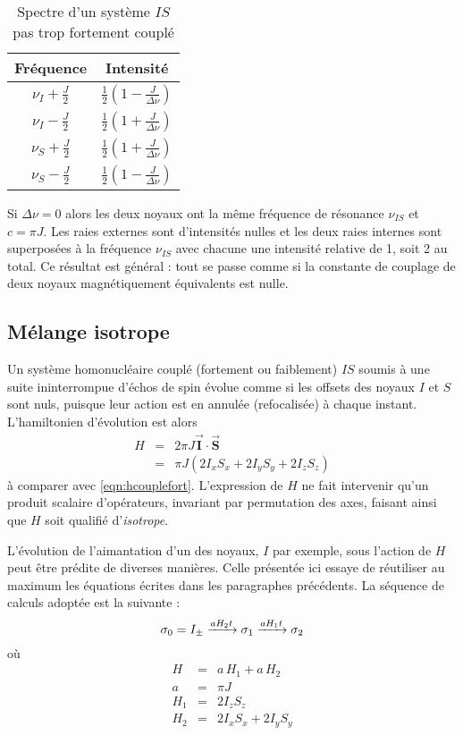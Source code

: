 \begin{table}[hbt]
\caption{Spectre d'un système $IS$ pas trop fortement couplé}
\label{tab:pastropfort}
\begin{center}
\begin{tabular}{cc}
\hline
Fréquence & Intensité \\ \hline
$\nu_I + \frac{J}{2}$ & 
$\frac{1}{2}\left(1 - \frac{J}{\Delta\nu} \right)$ \\
$\nu_I - \frac{J}{2}$ & 
$\frac{1}{2}\left(1 + \frac{J}{\Delta\nu} \right)$ \\
$\nu_S + \frac{J}{2}$ & 
$\frac{1}{2}\left(1 + \frac{J}{\Delta\nu} \right)$ \\
$\nu_S - \frac{J}{2}$ & 
$\frac{1}{2}\left(1 - \frac{J}{\Delta\nu} \right)$ \\
\hline
\end{tabular}
\end{center}
\end{table}

Si $\Delta\nu = 0$ alors les deux noyaux ont la même fréquence de résonance $\nu_{IS}$
et $c = \pi J$. Les raies externes sont d'intensités nulles et les deux raies internes
sont superposées à la fréquence $\nu_{IS}$ avec chacune une intensité relative de 1,
soit 2 au total.
Ce résultat est général : tout se passe comme si la constante de
couplage de deux noyaux magnétiquement équivalents est nulle.

\subsection{Mélange isotrope}
Un système homonucléaire couplé (fortement ou faiblement) 
$IS$ soumis à une suite ininterrompue d'échos de
spin évolue comme si les offsets des noyaux $I$ et $S$ sont nuls,
puisque leur action est en annulée (refocalisée) à chaque instant.
L'hamiltonien d'évolution est alors
\begin{eqnarray}
H & = & 2\pi J \boldsymbol{\vec{I}} \cdot \boldsymbol{\vec{S}} \\
\label{eqn:hisotrope}
& = & \pi J (2I_xS_x + 2I_yS_y + 2I_zS_z)
\end{eqnarray}
à comparer avec \ref{eqn:hcouplefort}.
L'expression de $H$ ne fait intervenir qu'un produit scalaire d'opérateurs,
invariant par permutation des axes, faisant ainsi que
$H$ soit qualifié d'\emph{isotrope}.

L'évolution de l'aimantation d'un des noyaux, $I$ par exemple,
sous l'action de $H$ peut être prédite de diverses manières.
Celle présentée ici essaye de réutiliser au maximum les équations
écrites dans les paragraphes précédents.
La séquence de calculs adoptée est la suivante :
\begin{equation}
\sigma_0 = I_{\pm}\xrightarrow{a H_2 t} \sigma_1
\xrightarrow{a H_1 t} \sigma_2
\end{equation}
où
\begin{eqnarray}
H & = & a \, H_1 + a \, H_2 \\
a & = & \pi J \\
H_1 & = & 2I_zS_z \\
H_2 & = & 2I_xS_x + 2I_yS_y
\end{eqnarray}

